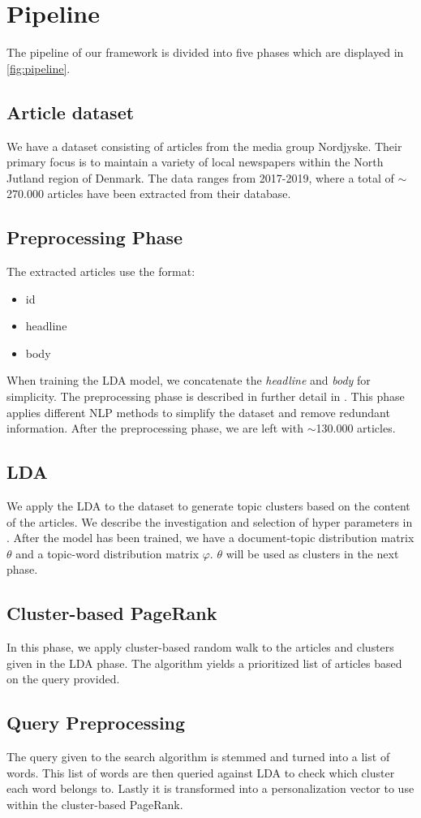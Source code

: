 \section{Pipeline}


The pipeline of our framework is divided into five phases which are displayed in \autoref{fig:pipeline}.

\subsection{Article dataset}
We have a dataset consisting of articles from the media group Nordjyske. Their primary focus is to maintain a variety of local newspapers within the North Jutland region of Denmark. 
The data ranges from 2017-2019, where a total of $\sim$270.000 articles have been extracted from their database.

\subsection{Preprocessing Phase}
The extracted articles use the format:
\begin{itemize}
	\item id
	\item headline
	\item body
\end{itemize}
When training the LDA model, we concatenate the \emph{headline} and \emph{body} for simplicity.
The preprocessing phase is described in further detail in .
This phase applies different \gls{NLP} methods to simplify the dataset and remove redundant information.
After the preprocessing phase, we are left with $\sim$130.000 articles.

\subsection{LDA}
We apply the \acrfull{LDA} to the dataset to generate topic clusters based on the content of the articles. 
We describe the investigation and selection of hyper parameters in . 
After the model has been trained, we have a document-topic distribution matrix $\theta$ and a topic-word distribution matrix $\varphi$.
$\theta$ will be used as clusters in the next phase.

\subsection{Cluster-based PageRank}
In this phase, we apply cluster-based random walk to the articles and clusters given in the \gls{LDA} phase.
The algorithm yields a prioritized list of articles based on the query provided.


\subsection{Query Preprocessing}
The query given to the search algorithm is stemmed and turned into a list of words. 
This list of words are then queried against LDA to check which cluster each word belongs to.
Lastly it is transformed into a personalization vector to use within the cluster-based PageRank.
